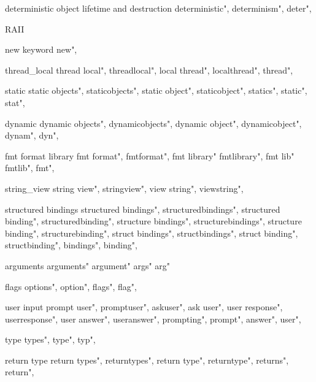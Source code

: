          deterministic object lifetime and destruction
        deterministic",  
        determinism",  
        deter",  
        
         RAII 
        
         new keyword 
        new",
        
         thread_local
        thread local",
        threadlocal",
        local thread",
        localthread",
        thread",
        
         static 
        static objects",
        staticobjects",
        static object",
        staticobject",
        statics",
        static",
        stat", 
        
         dynamic 
        dynamic objects",
        dynamicobjects",
        dynamic object",
        dynamicobject",
        dynam",
        dyn",
        
         fmt format library
        fmt format",
        fmtformat",
        fmt library"
        fmtlibrary",
        fmt lib"
        fmtlib",
        fmt",
          
         string_view
        string view",
        stringview",
        view string",
        viewstring",
        
         structured bindings
        structured bindings",
        structuredbindings",
        structured binding",
        structuredbinding", 
        structure bindings",
        structurebindings", 
        structure binding", 
        structurebinding",
        struct bindings",
        structbindings",
        struct binding",
        structbinding",
        bindings",
        binding",
        
         arguments 
        arguments"
        argument"
        args"
        arg"
        
         flags 
        options",
        option",
        flags",
        flag",
        
         user input 
        prompt user",  
        promptuser",  
        askuser",  
        ask user",  
        user response",  
        userresponse",  
        user answer",  
        useranswer",  
        prompting",  
        prompt",  
        answer",  
        user",  
        
         type 
        types",  
        type",  
        typ",  
        
         return type 
        return types", 
        returntypes", 
        return type", 
        returntype", 
        returns", 
        return", 
        
